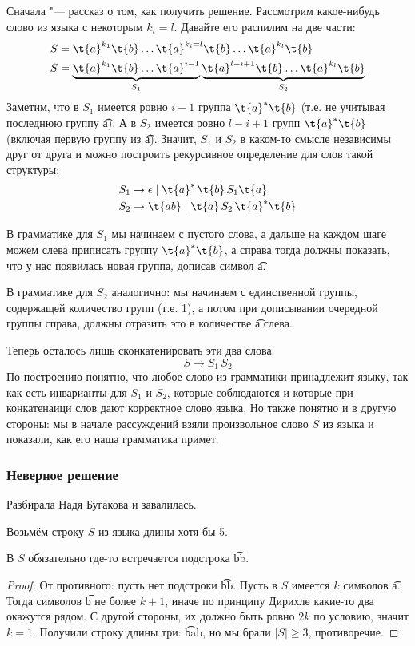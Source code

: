	Сначала "--- рассказ о том, как получить решение.
	Рассмотрим какое-нибудь слово из языка с некоторым $k_i=l$.
	Давайте его распилим на две части:
	\begin{align*}
		S &= \t{a}^{k_1}\t{b}\dots \t{a}^{k_i=l} \t{b} \dots \t{a}^{k_l} \t{b} \\
		S &= \underbrace{\t{a}^{k_1}\t{b}\dots \t{a}^{i-1}}_{S_1} \underbrace{\t{a}^{l-i+1} \t{b} \dots \t{a}^{k_l} \t{b}}_{S_2}
	\end{align*}
	Заметим, что в $S_1$ имеется ровно $i-1$ группа $\t{a}^*\t{b}$ (т.е. не учитывая последнюю группу \t{a}).
	А в $S_2$ имеется ровно $l-i+1$ групп $\t{a}^*\t{b}$ (включая первую группу из \t{a}).
	Значит, $S_1$ и $S_2$ в каком-то смысле независимы друг от друга и можно построить рекурсивное определение для слов такой структуры:
	\begin{align*}
		S_1 &\to \epsilon \mid \t{a}^*\,\t{b}\,S_1\t{a} \\
		S_2 &\to \t{ab} \mid \t{a}\,S_2\,\t{a}^*\t{b}
	\end{align*}

	В грамматике для $S_1$ мы начинаем с пустого слова, а дальше на каждом шаге можем слева приписать группу $\t{a}^*\t{b}$, а справа тогда
	должны показать, что у нас появилась новая группа, дописав символ \t{a}.

	В грамматике для $S_2$ аналогично: мы начинаем с единственной группы, содержащей количество групп (т.е. 1), а потом при дописывании очередной группы
	справа, должны отразить это в количестве \t{a} слева.

	Теперь осталось лишь сконкатенировать эти два слова:
	\[
		S \to S_1\, S_2
	\]
	По построению понятно, что любое слово из грамматики принадлежит языку, так как есть инварианты для $S_1$ и $S_2$, которые соблюдаются и которые
	при конкатенаици слов дают корректное слово языка.
	Но также понятно и в другую стороны: мы в начале рассуждений взяли произвольное слово $S$ из языка и показали, как его наша грамматика примет.

	\subsubsection{Неверное решение}
		Разбирала Надя Бугакова и завалилась.

		Возьмём строку $S$ из языка длины хотя бы 5.
		\begin{lemma}
			В $S$ обязательно где-то встречается подстрока \t{bb}.
		\end{lemma}
		\begin{proof}
			От противного: пусть нет подстроки \t{bb}.
			Пусть в $S$ имеется $k$ символов \t{a}.
			Тогда символов \t{b} не более $k+1$, иначе по принципу Дирихле какие-то два окажутся рядом.
			С другой стороны, их должно быть ровно $2k$ по условию, значит $k=1$.
			Получили строку длины три: \t{bab}, но мы брали $|S|\ge3$, противоречие.
		\end{proof}

